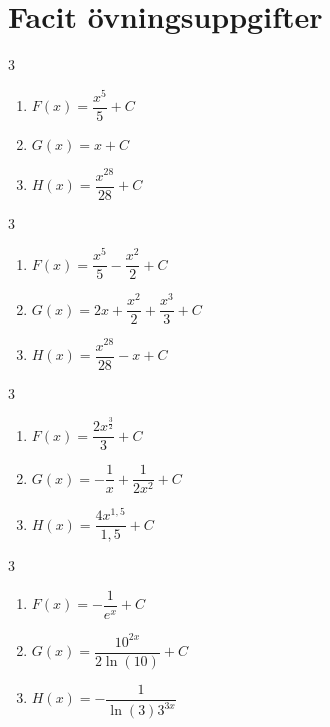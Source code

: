 \documentclass[a4paper, 12pt]{article}
\begin{document}
\appendix
\newpage
\section{Facit övningsuppgifter}

\begin{facit}
    \begin{multicols}{3}
        \begin{enumerate}
            \item $F(x) = \dfrac{x^5}5 + C$
            \item $G(x) = x + C$
            \item $H(x) = \dfrac{x^{28}}{28} + C$
        \end{enumerate}
    \end{multicols}
\end{facit}

\begin{facit}
    \begin{multicols}{3}
        \begin{enumerate}
            \item $F(x) = \dfrac{x^5}5 - \dfrac{x^2}2 + C$
            \item $G(x) = 2x + \dfrac{x^2}2 + \dfrac{x^3}3 + C$
            \item $H(x) = \dfrac{x^{28}}{28} - x + C$
        \end{enumerate}
    \end{multicols}
\end{facit}

\begin{facit}
    \begin{multicols}{3}
        \begin{enumerate}
            \item $F(x) = \dfrac{2x^{\frac 32}}3 + C$
            \item $G(x) = -\dfrac 1{x} + \dfrac1{2x^2} + C$
            \item $H(x) = \dfrac{4x^{1,5}}{1,5} + C$
        \end{enumerate}
    \end{multicols}
\end{facit}

\begin{facit}
    \begin{multicols}{3}
        \begin{enumerate}
            \item $F(x) = -\dfrac1{e^x} + C$
            \item $G(x) = \dfrac{10^{2x}}{2\ln(10)} + C$
            \item $H(x) = -\dfrac1{\ln(3)3^{3x}}$
        \end{enumerate}
    \end{multicols}
\end{facit}
\end{document}
